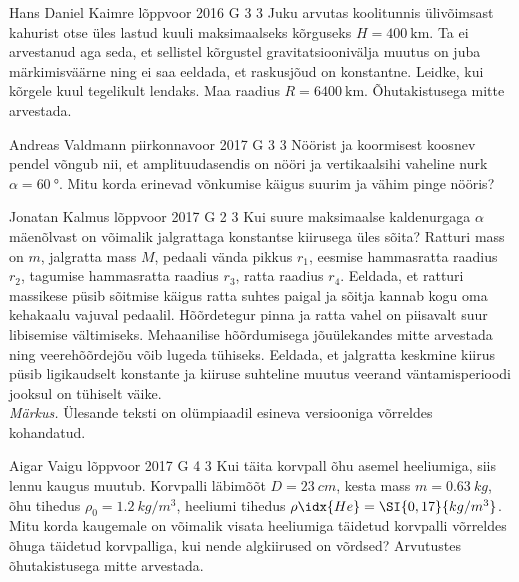 \documentclass[11pt]{article}
\begin{document}
{%
{Hans Daniel Kaimre} %
{lõppvoor} %
{2016} %
{G 3} %
{3} %
{
\ifStatement
Juku arvutas koolitunnis ülivõimsast kahurist otse üles lastud kuuli maksimaalseks kõrguseks $H=\SI{400}{\km}$. Ta ei arvestanud aga seda, et sellistel kõrgustel gravitatsioonivälja muutus on juba märkimisväärne ning ei saa eeldada, et raskusjõud on konstantne. Leidke, kui kõrgele kuul tegelikult lendaks. Maa raadius $R=\SI{6400}{\km}$. Õhutakistusega mitte arvestada.
\fi
}

{Andreas Valdmann} %
{piirkonnavoor} %
{2017} %
{G 3} %
{3} %
{
\ifStatement
Nöörist ja koormisest koosnev pendel võngub nii, et amplituudasendis on nööri ja vertikaalsihi vaheline nurk $\alpha=\SI{60}{\degree}$. Mitu korda erinevad võnkumise käigus suurim ja vähim pinge nööris?
\fi
}

{Jonatan Kalmus} %
{lõppvoor} %
{2017} %
{G 2} %
{3} %
{
\ifStatement
Kui suure maksimaalse kaldenurgaga $\alpha$ mäenõlvast on võimalik jalgrattaga konstantse kiirusega üles sõita? Ratturi mass on $m$, jalgratta mass $M$, pedaali vända pikkus $r_1$, eesmise hammasratta raadius $r_2$, tagumise hammasratta raadius $r_3$, ratta raadius $r_4$. Eeldada, et ratturi massikese püsib sõitmise käigus ratta suhtes paigal ja sõitja kannab kogu oma kehakaalu vajuval pedaalil. Hõõrdetegur pinna ja ratta vahel on piisavalt suur libisemise vältimiseks. Mehaanilise hõõrdumisega jõuülekandes mitte arvestada ning veerehõõrdejõu võib lugeda tühiseks. Eeldada, et jalgratta keskmine kiirus püsib ligikaudselt konstante ja kiiruse suhteline muutus veerand väntamisperioodi jooksul on tühiselt väike.\\
\emph{Märkus.} Ülesande teksti on olümpiaadil esineva versiooniga võrreldes kohandatud.
\fi
}

{Aigar Vaigu} %
{lõppvoor} %
{2017} %
{G 4} %
{3} %
{
\ifStatement
Kui täita korvpall õhu asemel heeliumiga, siis lennu kaugus muutub. Korvpalli läbimõõt $D=\SI{23}{cm}$, kesta mass $m=\SI{0,63}{kg}$, õhu tihedus $\rho_0=\SI{1,2}{kg/m^3}$, heeliumi tihedus $\rho\idx{He}=\SI{0,17}{kg/m^3}$. 
Mitu korda kaugemale on võimalik visata heeliumiga täidetud korvpalli võrreldes õhuga täidetud korvpalliga, kui nende algkiirused on võrdsed? Arvutustes õhutakistusega mitte arvestada.
\fi
}

}
\end{document}
